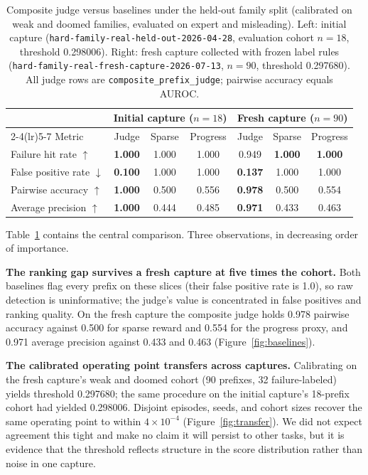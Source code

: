 \documentclass[11pt]{article}
\newcommand{\judgemode}[1]{\texttt{#1}}
\begin{document}
\begin{table}[t]
\centering
\small
\caption{Composite judge versus baselines under the held-out family split (calibrated on
weak and doomed families, evaluated on expert and misleading). Left: initial capture
(\texttt{hard-family-real-held-out-2026-04-28}, evaluation cohort $n{=}18$, threshold
0.298006). Right: fresh capture collected with frozen label rules
(\texttt{hard-family-real-fresh-capture-2026-07-13}, $n{=}90$, threshold 0.297680). All
judge rows are \judgemode{composite\_prefix\_judge}; pairwise accuracy equals AUROC.}
\label{tab:heldout}
\begin{tabular}{lcccccc}
\toprule
& \multicolumn{3}{c}{Initial capture ($n{=}18$)} & \multicolumn{3}{c}{Fresh capture ($n{=}90$)}\\
\cmidrule(lr){2-4}\cmidrule(lr){5-7}
Metric & Judge & Sparse & Progress & Judge & Sparse & Progress\\
\midrule
Failure hit rate $\uparrow$ & \textbf{1.000} & 1.000 & 1.000 & 0.949 & \textbf{1.000} & \textbf{1.000}\\
False positive rate $\downarrow$ & \textbf{0.100} & 1.000 & 1.000 & \textbf{0.137} & 1.000 & 1.000\\
Pairwise accuracy $\uparrow$ & \textbf{1.000} & 0.500 & 0.556 & \textbf{0.978} & 0.500 & 0.554\\
Average precision $\uparrow$ & \textbf{1.000} & 0.444 & 0.485 & \textbf{0.971} & 0.433 & 0.463\\
\bottomrule
\end{tabular}
\end{table}

Table~\ref{tab:heldout} contains the central comparison. Three observations, in decreasing
order of importance.

\textbf{The ranking gap survives a fresh capture at five times the cohort.} Both baselines
flag every prefix on these slices (their false positive rate is 1.0), so raw detection is
uninformative; the judge's value is concentrated in false positives and ranking quality. On
the fresh capture the composite judge holds 0.978 pairwise accuracy against 0.500 for sparse
reward and 0.554 for the progress proxy, and 0.971 average precision against 0.433 and
0.463 (Figure~\ref{fig:baselines}).

\textbf{The calibrated operating point transfers across captures.} Calibrating on the fresh
capture's weak and doomed cohort (90 prefixes, 32 failure-labeled) yields threshold
0.297680; the same procedure on the initial capture's 18-prefix cohort had yielded
0.298006. Disjoint episodes, seeds, and cohort sizes recover the same operating point to
within $4\times10^{-4}$ (Figure~\ref{fig:transfer}). We did not expect agreement this tight
and make no claim it will persist to other tasks, but it is evidence that the threshold
reflects structure in the score distribution rather than noise in one capture.
\end{document}
